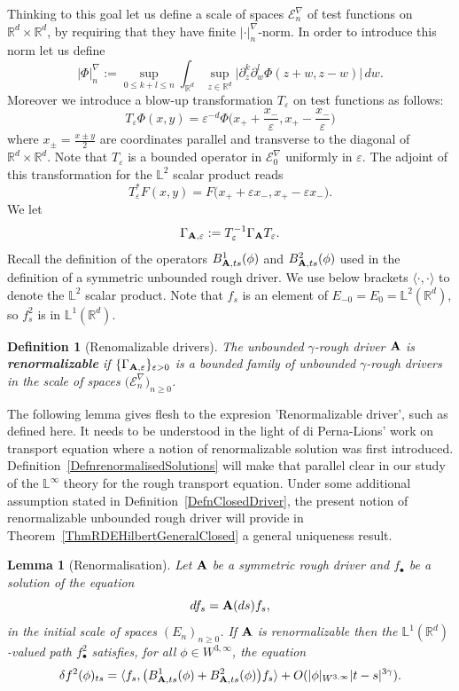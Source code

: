 \documentclass[11pt,a4paper]{amsart}
\newcommand{\RR}{\mathbb{R}}  \newcommand{\CC}{\mathbb{C}}  \newcommand{\LL}{\mathbb{L}}  \newcommand{\WW}{\mathbb{W}}
\newcommand{\mcE}{\mathcal{E}}
\newcommand{\varep}{\varepsilon}
\renewcommand{\geq}{\geqslant}
\newtheorem{lem}[thm]{\hspace{-0.15cm}  {\sc Lemma} }%
\newtheorem{defn}[thm]{ \hspace{-0.3cm} {\sc Definition}}%
\numberwithin{equation}{section} %
\begin{document}
Thinking to this goal let us define a scale of spaces $\mcE^\nabla_n$ of test functions on  $\RR^d \times \RR^d$, by requiring that they have finite $| \cdot |^\nabla_n$-norm. In order to introduce this norm let us define
$$
| \Phi |^\nabla_n :=\sup_{0\le k+l\le n}  \int_{\RR^d} \sup_{z\in\RR^d} \big|\partial_z^k \partial_w^l\Phi(z+w, z-w)\big|\, dw.
$$ 
Moreover we introduce a blow-up transformation $T_\varepsilon$ on test functions as follows:
$$
T_\varepsilon \Phi(x,y) =\varepsilon^{-d} \Phi\big(x_+ + \frac{x_-}{\varep}, x_+ - \frac{x_-}{\varep}\big) 
$$
where $x_\pm = \frac{x \pm y}{2}$ are coordinates parallel and transverse to the diagonal of $\RR^d \times \RR^d$. Note that $T_\varepsilon$ is a bounded operator in $\mcE^\nabla_0$ uniformly in $\varepsilon$. The adjoint of this transformation for the $\LL^2$ scalar product reads
$$
T^*_\varepsilon F(x,y) = F\big(x_+ + \varepsilon x_- , x_+ -\varepsilon x_-\big).
$$
We let  
$$
\Gamma_{\bf A,\varepsilon} := T_\varepsilon^{-1}\Gamma_{\bf A}T_\varepsilon.
$$ 
Recall the definition of the operators $ B^1_{{\bf A},ts}(\phi)$ and $ B^2_{{\bf A},ts}(\phi)$ used in the definition of a symmetric unbounded rough driver. We use below brackets $\langle\cdot,\cdot\rangle$ to denote the $\LL^2$ scalar product. Note that $f_s$ is an element of $E_{-0} = E_0 = \LL^2(\RR^d)$, so $f_s^2$ is in $\LL^1(\RR^d)$. 
 
\begin{defn}[Renomalizable drivers]
The unbounded $\gamma$-rough driver $\bf A$ is \textbf{\emph{renormalizable}} if $\{\Gamma_{\bf A,\varepsilon}\}_{\varepsilon>0}$  is a bounded family of unbounded $\gamma$-rough drivers in the scale of spaces $\big(\mcE^\nabla_n\big)_{n\geq 0}$.
\end{defn} 

The following lemma gives flesh to the expresion 'Renormalizable driver', such as defined here. It needs to be understood in the light of di Perna-Lions' work on transport equation \cite{diPernaLions} where a notion of renormalizable solution was first introduced. Definition~\ref{DefnrenormalisedSolutions} will make that parallel clear in our study of the $\LL^\infty$ theory for the rough transport equation. Under some additional assumption stated in Definition~\ref{DefnClosedDriver}, the present notion of renormalizable unbounded rough driver will provide in Theorem~\ref{ThmRDEHilbertGeneralClosed} a general uniqueness result.  

\begin{lem}[Renormalisation]
\label{Lemmarenormalisation}
Let $\bf A$ be a symmetric rough driver and $f_\bullet$ be a solution of the equation 
$$
df_s = {\bf A}(ds)f_s,
$$ 
in the initial scale of spaces $(E_n)_{n\geq 0}$. If $\bf A$ is renormalizable 
then the $\LL^1(\RR^d)$-valued path $f^2_\bullet$ satisfies, for all $\phi \in W^{3,\infty}$, the equation
\begin{equation} 
\label{EqPrimitiveGronwall}
\delta f^2(\phi)_{ts} =  \langle f_s , \big(B^1_{{\bf A},ts}(\phi) + B^2_{{\bf A},ts}(\phi)\big) f_s\rangle  + O (| \phi |_{W^{3,\infty}} | t - s |^{3 \gamma}) .
\end{equation}
 \end{lem}
\end{document}
